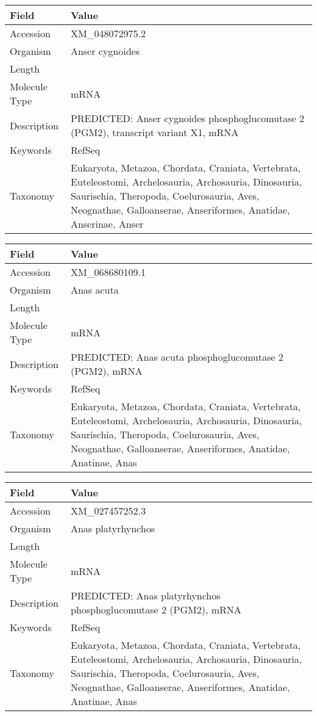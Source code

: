 \documentclass[10pt]{article}
\begin{document}
{\footnotesize
\begin{longtable}{>{\raggedright\arraybackslash}p{4.5cm} >{\raggedright\arraybackslash}p{11.5cm}}
\textbf{Field} & \textbf{Value} \\
\hline
Accession & XM\_048072975.2 \\
Organism & Anser cygnoides \\
Length & 2828 \\
Molecule Type & mRNA \\
Description & PREDICTED: Anser cygnoides phosphoglucomutase 2 (PGM2), transcript variant X1, mRNA \\
Keywords & RefSeq \\
Taxonomy & Eukaryota, Metazoa, Chordata, Craniata, Vertebrata, Euteleostomi, Archelosauria, Archosauria, Dinosauria, Saurischia, Theropoda, Coelurosauria, Aves, Neognathae, Galloanserae, Anseriformes, Anatidae, Anserinae, Anser \\
\end{longtable}
}

{\footnotesize
\begin{longtable}{>{\raggedright\arraybackslash}p{4.5cm} >{\raggedright\arraybackslash}p{11.5cm}}
\textbf{Field} & \textbf{Value} \\
\hline
Accession & XM\_068680109.1 \\
Organism & Anas acuta \\
Length & 2435 \\
Molecule Type & mRNA \\
Description & PREDICTED: Anas acuta phosphoglucomutase 2 (PGM2), mRNA \\
Keywords & RefSeq \\
Taxonomy & Eukaryota, Metazoa, Chordata, Craniata, Vertebrata, Euteleostomi, Archelosauria, Archosauria, Dinosauria, Saurischia, Theropoda, Coelurosauria, Aves, Neognathae, Galloanserae, Anseriformes, Anatidae, Anatinae, Anas \\
\end{longtable}
}

{\footnotesize
\begin{longtable}{>{\raggedright\arraybackslash}p{4.5cm} >{\raggedright\arraybackslash}p{11.5cm}}
\textbf{Field} & \textbf{Value} \\
\hline
Accession & XM\_027457252.3 \\
Organism & Anas platyrhynchos \\
Length & 2438 \\
Molecule Type & mRNA \\
Description & PREDICTED: Anas platyrhynchos phosphoglucomutase 2 (PGM2), mRNA \\
Keywords & RefSeq \\
Taxonomy & Eukaryota, Metazoa, Chordata, Craniata, Vertebrata, Euteleostomi, Archelosauria, Archosauria, Dinosauria, Saurischia, Theropoda, Coelurosauria, Aves, Neognathae, Galloanserae, Anseriformes, Anatidae, Anatinae, Anas \\
\end{longtable}
}
\end{document}
